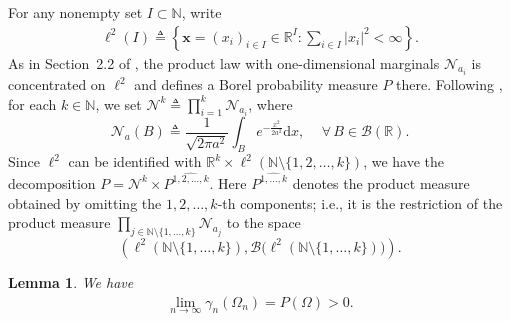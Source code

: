 \documentclass[12pt]{article}
\theoremstyle{plain}
\newtheorem{lemma}[theorem]{Lemma}
\theoremstyle{definition}
\theoremstyle{remark}
\numberwithin{equation}{section}
\begin{document}
For any nonempty set $I\subset \mathbb{N}$, write
\begin{eqnarray*}
	\ell^2(I)\triangleq \left\{\textbf{x}=(x_i)_{i\in I}\in \mathbb{R}^{I}:\sum_{i\in I}|x_i|^2<\infty\right\}.
\end{eqnarray*}
As in Section~2.2 of \cite[pp.~523--525]{YZ}, the product law with one-dimensional marginals $\mathcal N_{a_i}$ is concentrated on $\ell^2$ and defines a Borel probability measure $P$ there. Following \cite[(8), p.~523]{YZ}, for each $k\in\mathbb{N}$, we set $\mathcal{N}^k\triangleq\prod\limits_{i=1}^{k}\mathcal{N}_{a_i}$, where
$$
\mathcal{N}_a(B)\triangleq \frac{1}{\sqrt{2\pi a^2}}\int_Be^{-\frac{x^2}{2a^2}}\mathrm{d}x,\quad\,\forall\, B\in\mathscr{B}(\mathbb{R}).
$$
Since $\ell^2$ can be identified with $\mathbb{R}^k\times \ell^{2}(\mathbb{N}\setminus\{1,2,\ldots,k\})$, we have the decomposition  $P=\mathcal{N}^k\times P^{\widehat{1,2,\ldots,k}}$.  Here $P^{\widehat{1,\ldots,k}}$ denotes the product measure obtained by omitting the $1,2,\ldots,k$-th components; i.e., it is the restriction of the product measure $\prod\limits_{j\in\mathbb{N}\setminus\{1,\ldots,k\}}\mathcal{N}_{a_j}$ to the space
$$
\left(\ell^{2}(\mathbb{N}\setminus\{1,\ldots,k\}),\mathscr{B}\big(\ell^{2}(\mathbb{N}\setminus\{1,\ldots,k\})\big)\right).
$$
\begin{lemma}\label{jihejixian}
	We have
	\begin{eqnarray}
		\lim_{n\rightarrow \infty} \gamma_{n} \left( \Omega_{n} \right) =P\left( \Omega \right) >0.\label{13f13f13g}
	\end{eqnarray}
\end{lemma}
\end{document}
